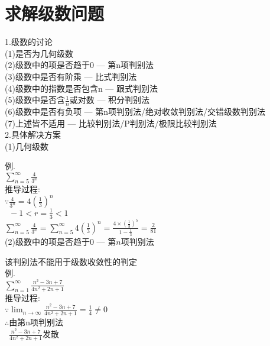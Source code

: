 \chapter{求解级数问题}
1.级数的讨论\\
(1)是否为几何级数\\
(2)级数中的项是否趋于0 --- 第n项判别法\\
(3)级数中是否有阶乘 --- 比式判别法\\
(4)级数中的指数是否包含n --- 跟式判别法\\
(5)级数中是否含$\frac{1}{n}$或对数 --- 积分判别法\\
(6)级数中是否有负项 --- 第n项判别法/绝对收敛判别法/交错级数判别法\\
(7)上述皆不适用 --- 比较判别法/P判别法/极限比较判别法\\[2ex]

2.具体解决方案\\
(1)几何级数\\
\begin{center}
\end{center}
例.\\
$\displaystyle\sum_{n=5}^{\infty}\frac{4}{3^n}$\\
推导过程:\\
$\displaystyle\because\frac{4}{3^n}=4(\frac{1}{3})^n$\\
$\displaystyle\phantom{\because}-1<r=\frac{1}{3}<1$\\
$\displaystyle\sum_{n=5}^{\infty}\frac{4}{3^n}=\sum_{n=5}^{\infty}4(\frac{1}{3})^n=\frac{4\times(\frac{1}{3})^5}{1-\frac{1}{3}}=\frac{2}{81}$\\[2ex]

(2)级数中的项是否趋于$0$ --- 第$n$项判别法\\
\begin{center}
\end{center}
该判别法不能用于级数收敛性的判定\\
例.\\
$\displaystyle\sum_{n=1}^{\infty}\frac{n^2-3n+7}{4n^2+2n+1}$\\[1ex]
推导过程:\\
$\displaystyle\because\lim_{n\to\infty}\frac{n^2-3n+7}{4n^2+2n+1}=\frac{1}{4}\neq 0$\\
$\therefore$由第n项判别法\\
$\displaystyle\phantom{\therefore}\frac{n^2-3n+7}{4n^2+2n+1}$发散\\[2ex]

